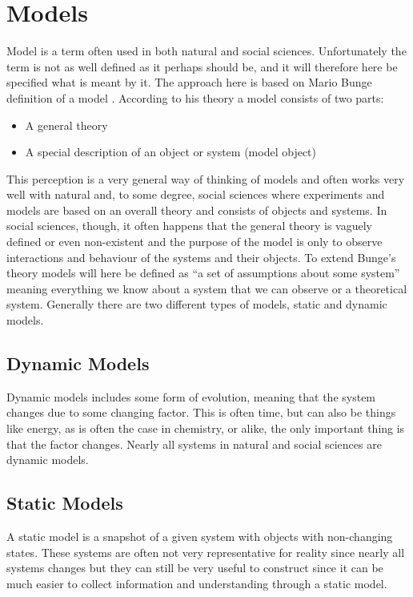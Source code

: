 \section{Models}
\label{sec:models}
Model is a term often used in both natural and social sciences. Unfortunately the term is not as well defined as it perhaps should be, and it will therefore here be specified what is meant by it. The approach here is based on Mario Bunge definition of a model . According to his theory a model consists of two parts:

\begin{itemize}
\item A general theory
\item A special description of an object or system (model object)
\end{itemize}

This perception is a very general way of thinking of models and often works very well with natural and, to some degree, social sciences where experiments and models are based on an overall theory and consists of objects and systems. In social sciences, though, it often happens that the general theory is vaguely defined or even non-existent and the purpose of the model is only to observe interactions and behaviour of the systems and their objects.
To extend Bunge's theory models will here be defined as \enquote{a set of assumptions about some system} meaning everything we know about a system that we can observe or a theoretical system.
Generally there are two different types of models, static and dynamic models.


\subsection{Dynamic Models}
Dynamic models includes some form of evolution, meaning that the system changes due to some changing factor. This is often time, but can also be things like energy, as is often the case in chemistry, or alike, the only important thing is that the factor changes. Nearly all systems in natural and social sciences are dynamic models.


\subsection{Static Models}
A static model is a snapshot of a given system with objects with non-changing states. These systems are often not very representative for reality since nearly all systems changes but they can still be very useful to construct since it can be much easier to collect information and understanding through a static model. 


